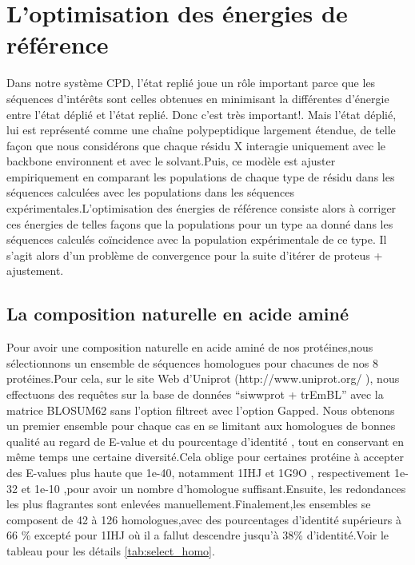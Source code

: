 \section{L'optimisation des énergies de référence} 
\label{sec:optERef}

Dans notre système CPD, l'état replié joue un rôle important parce que les séquences d’intérêts sont celles obtenues en minimisant la différentes d’énergie entre l'état déplié et l'état replié. Donc c'est très important!.
Mais l'état déplié, lui est représenté comme une chaîne polypeptidique largement étendue, de telle façon que nous considérons que chaque résidu X interagie uniquement avec le backbone environnent et avec le solvant.Puis, ce modèle est ajuster empiriquement en comparant les populations de chaque type de résidu dans les séquences calculées avec les populations dans les séquences expérimentales.L'optimisation des énergies de référence consiste alors à corriger ces énergies de telles façons que la populations pour un type aa donné dans les séquences calculés coïncidence avec la population expérimentale de ce type. Il s'agit alors d'un problème de convergence pour la suite d'itérer de proteus + ajustement.

\subsection{La composition naturelle en acide aminé}

Pour avoir une composition naturelle en acide aminé de nos protéines,nous sélectionnons un ensemble de séquences homologues pour chacunes de nos 8 protéines.Pour cela, sur le site Web d'Uniprot (http://www.uniprot.org/ ), nous effectuons des requêtes sur la base de données ``siwwprot + trEmBL'' avec la matrice BLOSUM62 sans l'option \og filtre\fg et avec l'option \og Gapped\fg. Nous obtenons un premier ensemble pour chaque cas en se limitant aux homologues de bonnes qualité au regard de E-value et du pourcentage d'identité , tout en conservant  en même temps une certaine diversité.Cela oblige pour certaines protéine à accepter des E-values plus haute que  1e-40, notamment 1IHJ et 1G9O , respectivement 1e-32 et 1e-10 ,pour avoir un nombre d'homologue suffisant.Ensuite, les redondances les plus flagrantes sont enlevées manuellement.Finalement,les ensembles se composent de 42 à 126 homologues,avec des pourcentages d'identité supérieurs à 66 \% excepté pour 1IHJ où il a fallut descendre jusqu'à 38\% d'identité.Voir le tableau pour les détails \ref{tab:select_homo}.


